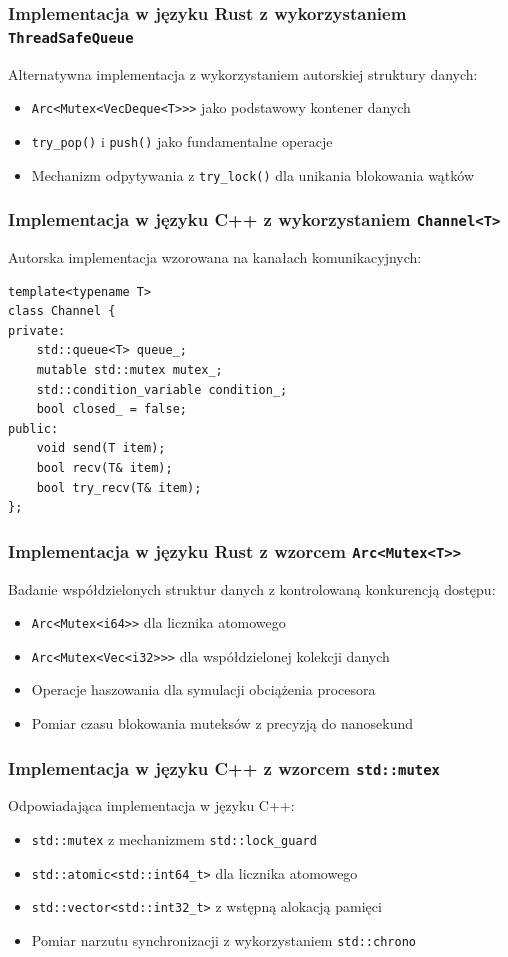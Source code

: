 \subsubsection{Implementacja w języku Rust z wykorzystaniem \texttt{ThreadSafeQueue}}
Alternatywna implementacja z wykorzystaniem autorskiej struktury danych:
\begin{itemize}
    \item \texttt{Arc<Mutex<VecDeque<T>>>} jako podstawowy kontener danych
    \item \texttt{try\_pop()} i \texttt{push()} jako fundamentalne operacje
    \item Mechanizm odpytywania  z \texttt{try\_lock()} dla unikania blokowania wątków
\end{itemize}

\subsubsection{Implementacja w języku C++ z wykorzystaniem \texttt{Channel<T>}}
Autorska implementacja wzorowana na kanałach komunikacyjnych:
\begin{verbatim}
template<typename T>
class Channel {
private:
    std::queue<T> queue_;
    mutable std::mutex mutex_;
    std::condition_variable condition_;
    bool closed_ = false;
public:
    void send(T item);
    bool recv(T& item);
    bool try_recv(T& item);
};
\end{verbatim}

\subsubsection{Implementacja w języku Rust z wzorcem \texttt{Arc<Mutex<T>>}}
Badanie współdzielonych struktur danych z kontrolowaną konkurencją dostępu:
\begin{itemize}
    \item \texttt{Arc<Mutex<i64>>} dla licznika atomowego
    \item \texttt{Arc<Mutex<Vec<i32>>>} dla współdzielonej kolekcji danych
    \item Operacje haszowania dla symulacji obciążenia procesora
    \item Pomiar czasu blokowania muteksów z precyzją do nanosekund
\end{itemize}

\subsubsection{Implementacja w języku C++ z wzorcem \texttt{std::mutex}}
Odpowiadająca implementacja w języku C++:
\begin{itemize}
    \item \texttt{std::mutex} z mechanizmem \texttt{std::lock\_guard}
    \item \texttt{std::atomic<std::int64\_t>} dla licznika atomowego
    \item \texttt{std::vector<std::int32\_t>} z wstępną alokacją pamięci
    \item Pomiar narzutu synchronizacji z wykorzystaniem \texttt{std::chrono}
\end{itemize}

